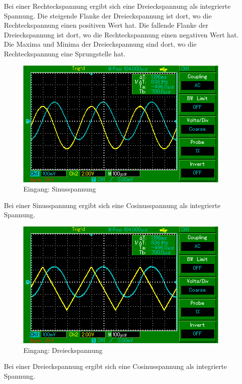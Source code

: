 Bei einer Rechteckspannung ergibt sich eine Dreieckspannung als integrierte Spannung.
Die steigende Flanke der Dreieckspannung ist dort, wo die Rechteckspannung einen positiven Wert hat.
Die fallende Flanke der Dreieckspannung ist dort, wo die Rechteckspannung einen negativen Wert hat.
Die Maxima und Minima der Dreieckspannung sind dort, wo die Rechteckspannung eine Sprungstelle hat.

\begin{figure}[H]
  \centering
  \includegraphics{MAP002.png}
  \caption{Eingang: Sinusspannung }
  \label{fig:Sinusspannung}
\end{figure}

Bei einer Sinusspannung ergibt sich eine Cosinusspannung als integrierte Spannung.

\begin{figure}[H]
  \centering
  \includegraphics{MAP003.png}
  \caption{Eingang: Dreieckspannung}
  \label{fig:Dreieckspannung}
\end{figure}

Bei einer Dreieckspannung ergibt sich eine Cosinusspannung als integrierte Spannung.
